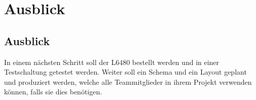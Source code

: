 \ifSTANDALONE
\section{Ausblick}
\fi
\ifEMBED
\subsection{Ausblick}
\fi
	In einem nächsten Schritt soll der L6480 bestellt werden und in einer 
    Testschaltung getestet werden. Weiter soll ein Schema und ein Layout 
    geplant und produziert werden, welche alle Teammitglieder in ihrem Projekt 
    verwenden können, falls sie dies benötigen. 
